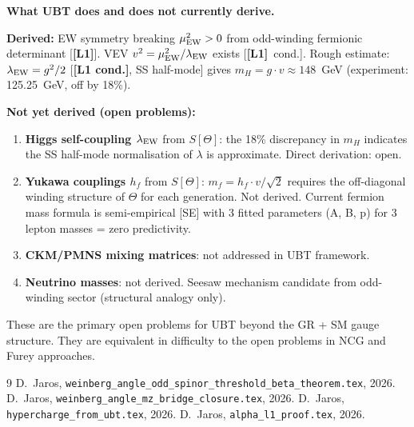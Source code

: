 \documentclass[12pt,a4paper]{article}
\theoremstyle{remark}\newtheorem{remark}[theorem]{Remark}
\newcommand{\Lo}{\textbf{[L1]}}
\newcommand{\Lc}{\textbf{[L1 cond.]}}
\begin{document}
\begin{insightbox}
\textbf{What UBT does and does not currently derive.}

\medskip
\textbf{Derived:}
EW symmetry breaking $\mu^2_{\rm EW}>0$ from odd-winding fermionic
determinant [\Lo]. VEV $v^2=\mu^2_{\rm EW}/\lambda_{\rm EW}$ exists [\Lo\ cond.].
Rough estimate: $\lambda_{\rm EW}=g^2/2$ [\Lc, SS half-mode]
gives $m_H=g\cdot v\approx148$~GeV (experiment: 125.25~GeV, off by 18\%).

\medskip
\textbf{Not yet derived (open problems):}
\begin{enumerate}
\item \textbf{Higgs self-coupling $\lambda_{\rm EW}$} from $S[\Theta]$:
  the 18\% discrepancy in $m_H$ indicates the SS half-mode
  normalisation of $\lambda$ is approximate. Direct derivation: open.

\item \textbf{Yukawa couplings $h_f$} from $S[\Theta]$:
  $m_f=h_f\cdot v/\sqrt{2}$ requires the off-diagonal winding
  structure of $\Theta$ for each generation. Not derived.
  Current fermion mass formula is semi-empirical [SE] with
  3 fitted parameters (A, B, p) for 3 lepton masses = zero predictivity.

\item \textbf{CKM/PMNS mixing matrices}: not addressed in UBT framework.

\item \textbf{Neutrino masses}: not derived. Seesaw mechanism candidate
  from odd-winding sector (structural analogy only).
\end{enumerate}

\medskip
These are the primary open problems for UBT beyond the GR + SM
gauge structure. They are equivalent in difficulty to the open
problems in NCG and Furey approaches.
\end{insightbox}

\begin{thebibliography}{9}
  D.~Jaros,
  \texttt{weinberg\_angle\_odd\_spinor\_threshold\_beta\_theorem.tex}, 2026.
  D.~Jaros, \texttt{weinberg\_angle\_mz\_bridge\_closure.tex}, 2026.
  D.~Jaros, \texttt{hypercharge\_from\_ubt.tex}, 2026.
  D.~Jaros, \texttt{alpha\_l1\_proof.tex}, 2026.
\end{thebibliography}

\ifdefined\INCLUDEMODE\else
\end{document}

